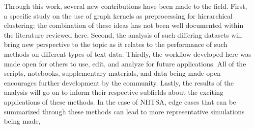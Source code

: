 Through this work, several new contributions have been made to the field. First, a specific study on the use of graph kernels as preprocessing for hierarchical clustering; the combination of these ideas has not been well documented within the literature reviewed here. Second, the analysis of such differing datasets will bring new perspective to the topic as it relates to the performance of such methods on different types of text data. Thirdly, the workflow developed here was made open for others to use, edit, and analyze for future applications. All of the scripts, notebooks, supplementary materials, and data being made open encourages further development by the community. Lastly, the results of the analysis will go on to inform their respective subfields about the exciting applications of these methods. In the case of NHTSA, edge cases that can be summarized through these methods can lead to more representative simulations being made,  

 

 


